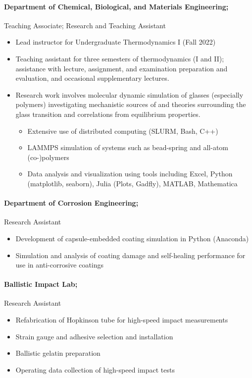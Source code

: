 \documentclass{my_cv}
\begin{document}
\paragraph{Department of Chemical, Biological, and Materials Engineering;\\}
Teaching Associate; Research and Teaching Assistant
\begin{itemize}
    \item Lead instructor for Undergraduate Thermodynamics I (Fall 2022)
    \item Teaching assistant for three semesters of thermodynamics (I and II); assistance with lecture, assignment, and examination preparation and evaluation, and occasional supplementary lectures.
    \item Research work involves molecular dynamic simulation of glasses (especially polymers) investigating mechanistic sources of and theories surrounding the glass transition and correlations from equilibrium properties.
    \begin{itemize}
        \item Extensive use of distributed computing (SLURM, Bash, C++)
        \item LAMMPS simulation of systems such as bead-spring and all-atom (co-)polymers
        \item Data analysis and visualization using tools including Excel, Python (matplotlib, seaborn), Julia (Plots, Gadfly), MATLAB, Mathematica
    \end{itemize}
\end{itemize}

\paragraph{Department of Corrosion Engineering;}
Research Assistant
\begin{itemize}
    \item Development of capsule-embedded coating simulation in Python (Anaconda)
    \item Simulation and analysis of coating damage and self-healing performance for use in anti-corrosive coatings
\end{itemize}

\paragraph{Ballistic Impact Lab;}
Research Assistant
\begin{itemize}
    \item Re\-fabrication of Hopkins\-on tube for high-speed impact measurements
    \item Strain gauge and adhesive selection and installation
    \item Ballistic gelatin preparation
    \item Operating data collection of high-speed impact tests 
\end{itemize}
\end{document}
